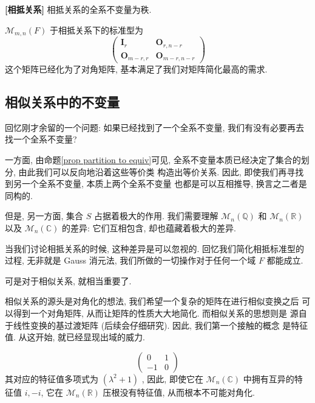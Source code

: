 \documentclass[UTF8]{book}
\begin{document}
\begin{example}
    \textbf{[相抵关系]} 
    相抵关系的全系不变量为秩. 

    $\mathcal{M}_{m,n}(F)$ 于相抵关系下的标准型为 
    $$
    \begin{pmatrix}
        \boldsymbol{I}_r & \boldsymbol{O}_{r,n-r} \\
        \boldsymbol{O}_{m-r,r}   & \boldsymbol{O}_{m-r,n-r}
    \end{pmatrix}
    $$
    这个矩阵已经化为了对角矩阵, 
    基本满足了我们对矩阵简化最高的需求. 
\end{example}

\subsection{相似关系中的不变量}

回忆刚才余留的一个问题: 
如果已经找到了一个全系不变量, 我们有没有必要再去找一个全系不变量?

一方面, 由命题\ref{prop partition to equiv}可见, 
全系不变量本质已经决定了集合的划分, 由此我们可以反向地沿着这些等价类
构造出等价关系. 因此, 即使我们再寻找到另一个全系不变量, 本质上两个全系不变量
也都是可以互相推导, 换言之二者是同构的. 

但是, 另一方面, 集合 $S$ 占据着极大的作用. 
我们需要理解 $\mathcal{M}_{n}(\mathbb{Q})$ 和 $\mathcal{M}_{n}(\mathbb{R})$ 
以及 $\mathcal{M}_{n}(\mathbb{C})$ 的差异: 它们互相包含, 
却也蕴藏着极大的差异. 

当我们讨论相抵关系的时候, 这种差异是可以忽视的. 
回忆我们简化相抵标准型的过程, 无非就是 Gauss 消元法, 
我们所做的一切操作对于任何一个域 $F$ 都能成立. 

可是对于相似关系, 就相当重要了. 

相似关系的源头是对角化的想法, 我们希望一个复杂的矩阵在进行相似变换之后
可以得到一个对角矩阵, 从而让矩阵的性质大大地简化. 而相似关系的思想则是
源自于线性变换的基过渡矩阵 (后续会仔细研究). 因此, 我们第一个接触的概念
是特征值. 从这开始, 就已经显现出域的威力. 

\begin{example}
    $$
    \begin{pmatrix}
        0 & 1 \\
        -1 & 0
    \end{pmatrix} 
    $$
    其对应的特征值多项式为 $ (\lambda^2+1) $ , 
    因此, 即使它在 $\mathcal{M}_{n}(\mathbb{C})$ 中拥有互异的特征值 
    $i,-i$, 它在 $\mathcal{M}_{n}(\mathbb{R})$ 压根没有特征值, 
    从而根本不可能对角化.
\end{example}
\end{document}
